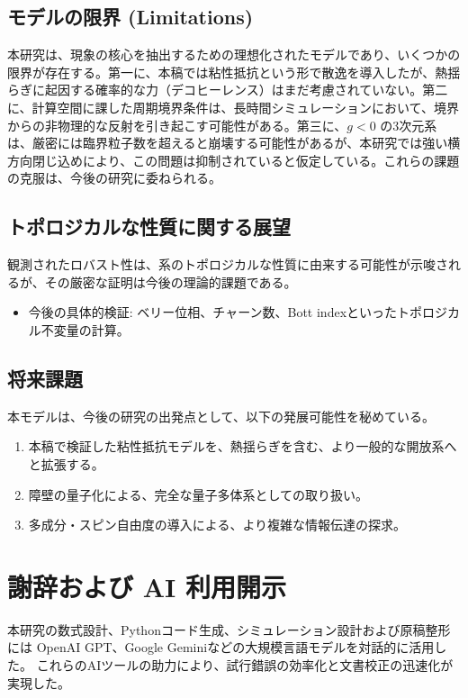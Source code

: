 \documentclass[a4paper,11pt,ja=standard]{bxjsarticle}
\begin{document}
\subsection{モデルの限界 (Limitations)}
本研究は、現象の核心を抽出するための理想化されたモデルであり、いくつかの限界が存在する。第一に、本稿では粘性抵抗という形で散逸を導入したが、熱揺らぎに起因する確率的な力（デコヒーレンス）はまだ考慮されていない。第二に、計算空間に課した周期境界条件は、長時間シミュレーションにおいて、境界からの非物理的な反射を引き起こす可能性がある。第三に、$g < 0$ の3次元系は、厳密には臨界粒子数を超えると崩壊する可能性があるが、本研究では強い横方向閉じ込めにより、この問題は抑制されていると仮定している。これらの課題の克服は、今後の研究に委ねられる。

\subsection{トポロジカルな性質に関する展望}
観測されたロバスト性は、系のトポロジカルな性質に由来する可能性が示唆されるが、その厳密な証明は今後の理論的課題である。
\begin{itemize}
    \item 今後の具体的検証: ベリー位相、チャーン数、Bott indexといったトポロジカル不変量の計算。
\end{itemize}

\subsection{将来課題}
本モデルは、今後の研究の出発点として、以下の発展可能性を秘めている。
\begin{enumerate}
    \item 本稿で検証した粘性抵抗モデルを、熱揺らぎを含む、より一般的な開放系へと拡張する。
    \item 障壁の量子化による、完全な量子多体系としての取り扱い。
    \item 多成分・スピン自由度の導入による、より複雑な情報伝達の探求。
\end{enumerate}

\section*{謝辞および AI 利用開示}
本研究の数式設計、Pythonコード生成、シミュレーション設計および原稿整形には
OpenAI GPT、Google Geminiなどの大規模言語モデルを対話的に活用した。
これらのAIツールの助力により、試行錯誤の効率化と文書校正の迅速化が実現した。

\FloatBarrier
\end{document}
